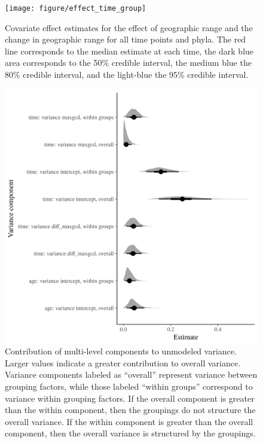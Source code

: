 \documentclass[12pt,letterpaper]{article}
\begin{document}
\begin{figure}[ht]
  \centering
  \texttt{[image: figure/effect\_time\_group]}
  \caption{Covariate effect estimates for the effect of geographic range and the change in geographic range for all time points and phyla. The red line corresponds to the median estimate at each time, the dark blue area corresponds to the 50\% credible interval, the medium blue the 80\% credible interval, and the light-blue the 95\% credible interval.}
  \label{fig:effect_time_group}
\end{figure}

\begin{figure}[ht]
  \centering
  \includegraphics[width=\textwidth,height=0.5\textheight,keepaspectratio=true]{figure/variance_components}
  \caption{Contribution of multi-level components to unmodeled variance. Larger values indicate a greater contribution to overall variance. Variance components labeled as ``overall'' represent variance between grouping factors, while those labeled  ``within groups'' correspond to variance within grouping factors. If the overall component is greater than the within component, then the groupings do not structure the overall variance. If the within component is greater than the overall component, then the overall variance is structured by the groupings.}
  \label{fig:variance_components}
\end{figure}

\end{document}
